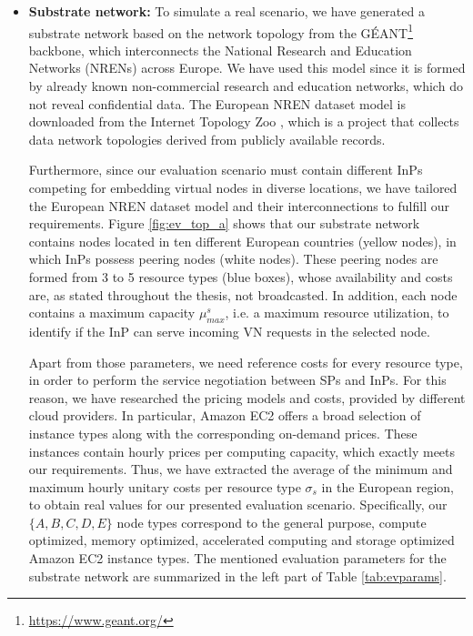 \begin{itemize}
 \item \textbf{Substrate network:} To simulate a real scenario, we have generated a substrate network based on the network topology from the GÉANT\footnote{\url{https://www.geant.org/}} backbone, which interconnects the National Research and Education Networks (NRENs) across Europe. We have used this model since it is formed by already known non-commercial research and education networks, which do not reveal confidential data. The European NREN dataset model is downloaded from the Internet Topology Zoo \citep{zoo}, which is a project that collects data network topologies derived from publicly available records.

Furthermore, since our evaluation scenario must contain different InPs competing for embedding virtual nodes in diverse locations, we have tailored the European NREN dataset model and their interconnections to fulfill our requirements. Figure \ref{fig:ev_top_a} shows that our substrate network contains nodes located in ten different European countries (yellow nodes), in which InPs possess peering nodes (white nodes). These peering nodes are formed from 3 to 5 resource types (blue boxes), whose availability and costs are, as stated throughout the thesis, not broadcasted. In addition, each node contains a maximum capacity $\mu^{s}_{max}$, i.e. a maximum resource utilization, to identify if the InP can serve incoming VN requests in the selected node.

Apart from those parameters, we need reference costs for every resource type, in order to perform the service negotiation between SPs and InPs. For this reason, we have researched the pricing models and costs, provided by different cloud providers. In particular, Amazon EC2 \citep{amazonEC2} offers a broad selection of instance types along with the corresponding on-demand prices. These instances contain hourly prices per computing capacity, which exactly meets our requirements. Thus, we have extracted the average of the minimum and maximum hourly unitary costs per resource type $\sigma_s$ in the European region, to obtain real values for our presented evaluation scenario.  Specifically, our $\{A, B, C, D, E\}$ node types correspond to the general purpose, compute optimized, memory optimized, accelerated computing and storage optimized Amazon EC2 instance types. The mentioned evaluation parameters for the substrate network are summarized in the left part of Table \ref{tab:evparams}.


\end{itemize}
